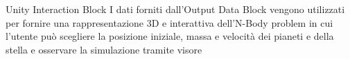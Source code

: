 \begin{frame}{Unity Interaction Block}
    I dati forniti dall'Output Data Block vengono utilizzati per fornire una rappresentazione 3D e interattiva dell'N-Body problem in cui l'utente può scegliere la posizione iniziale, massa e velocità dei pianeti e della stella e osservare la simulazione tramite visore 
\end{frame}